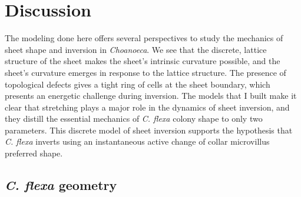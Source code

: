 
\chapter{Discussion} %

\ifpdf
    \graphicspath{{Chapter4/Figs/Raster/}{Chapter4/Figs/PDF/}{Chapter4/Figs/}}
\else
    \graphicspath{{Chapter4/Figs/Vector/}{Chapter4/Figs/}}
\fi

The modeling done here offers several perspectives to study the mechanics of sheet shape and inversion in \textit{Choanoeca}. 
We see that the discrete, lattice structure of the sheet makes the sheet's intrinsic curvature possible, and the sheet's curvature emerges in response to the lattice structure.
The presence of topological defects gives a tight ring of cells at the sheet boundary, which presents an energetic challenge during inversion.
The models that I built make it clear that stretching plays a major role in the dynamics of sheet inversion, and they distill the essential mechanics of \textit{C. flexa} colony shape to only two parameters.
This discrete model of sheet inversion supports the hypothesis that \textit{C. flexa} inverts using an instantaneous active change of collar microvillus preferred shape.

\section{\textit{C. flexa} geometry} 

